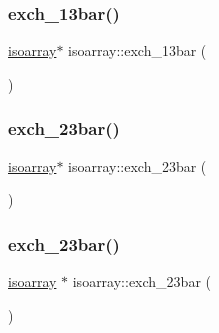 \subsubsection{\texorpdfstring{exch\_13bar()}{exch\_13bar()}\hspace{0.1cm}{\footnotesize\ttfamily [2/2]}}
{\footnotesize\ttfamily \mbox{\hyperlink{classisoarray}{isoarray}}$\ast$ isoarray\+::exch\+\_\+13bar (\begin{DoxyParamCaption}{ }\end{DoxyParamCaption})}

\mbox{\label{classisoarray_a9dd30b80f22c1bbc17633283f0056e69}} 
\subsubsection{\texorpdfstring{exch\_23bar()}{exch\_23bar()}\hspace{0.1cm}{\footnotesize\ttfamily [1/2]}}
{\footnotesize\ttfamily \mbox{\hyperlink{classisoarray}{isoarray}}$\ast$ isoarray\+::exch\+\_\+23bar (\begin{DoxyParamCaption}{ }\end{DoxyParamCaption})}

\mbox{\label{classisoarray_ac6b8d6c435627c589a5bfa9edfa7408d}} 
\subsubsection{\texorpdfstring{exch\_23bar()}{exch\_23bar()}\hspace{0.1cm}{\footnotesize\ttfamily [2/2]}}
{\footnotesize\ttfamily \mbox{\hyperlink{classisoarray}{isoarray}} $\ast$ isoarray\+::exch\+\_\+23bar (\begin{DoxyParamCaption}{ }\end{DoxyParamCaption})}

